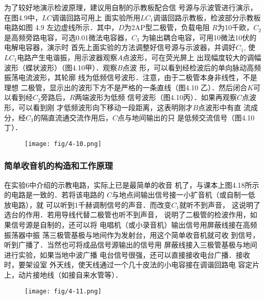 为了较好地演示检波原理，建议用自制的示教板配合信
号源与示波管进行演示，在图4.9中，$LC$调谐回路可用上
面实验所用$LC_1$调谐回路示教板，检波部分示教板电路如图
4.9 左边虚线所示．其中，$D$为2AP型二极管，负载电阻
$R$为10千欧，$C_2$是高频旁路电容，可选0.01微法电容器，$C_3$
为输出耦合电容，可用10微法10伏的电解电容器，演示时
首先上面实验的方法调整好信号源与示波器，并调好$C_1$, 使
$LC_1$电路产生电谐振，用示波器观察$A$点波形，可在荧光屏上
出现幅度较大的调幅波形（蝶状波形）（图4.10甲）．观察$B$点波
形，可以看到经检波后的单向脉动高频振荡电流波形，其轮廓
线为低频信号波形．注意，由于二极管本身非线性，不是理想
二极管，显示出的波形下方不是严格的一条直线（图4.10
乙）．然后闭合$K$可以看到经$C_2$旁路后，$R$两端波形为低频
信号波形（图4.10丙）．如果再观察$C$点波形，可以看到刚
才低频波形向下移动一段距离，这表明刚才$B$点波形中有直
流成分，经$C_3$的隔直流通交流作用后，$C$点与地间输出的只
是低频交流信号（图4.10丁）．

\begin{figure}[htp]
    \centering
\texttt{[image: fig/4-10.png]}
    \caption{}
\end{figure}

\subsubsection{简单收音机的构造和工作原理}
在实验6中介绍的示教电路，实际上已是最简单的收音
机了，与课本上图4.18所示的电路是一致的．若将该电路的
$C$与地点间输出信号接一小扩音机（或自制一低放电路），就
可以听到1千赫调制信号的声音．而改变$C_1$就听不到声音，
这说明了选台的作用．若用导线代替二极管也听不到声音，
说明了二极管的检波作用，如果信号源是自制的，还可以将
电唱机（或小录音机）输出信号用屏蔽线接在高频振荡器中振
荡三极管基极与地间作为发射台，用这个简单收音机就可收
到信号，听到广播了．当然也可将成品信号源输出的信号用
屏蔽线接入三极管基极与地间进行实验，如果当地中波广播
电台信号很强，还可以直接接收电台广播．接收时，要架设室
外天线，使天线通过一个几十皮法的小电容接在调谐回路电
容定片上，动片接地线（如接自来水管等）．

\begin{figure}[htp]
    \centering
\texttt{[image: fig/4-11.png]}
    \caption{}
\end{figure}

